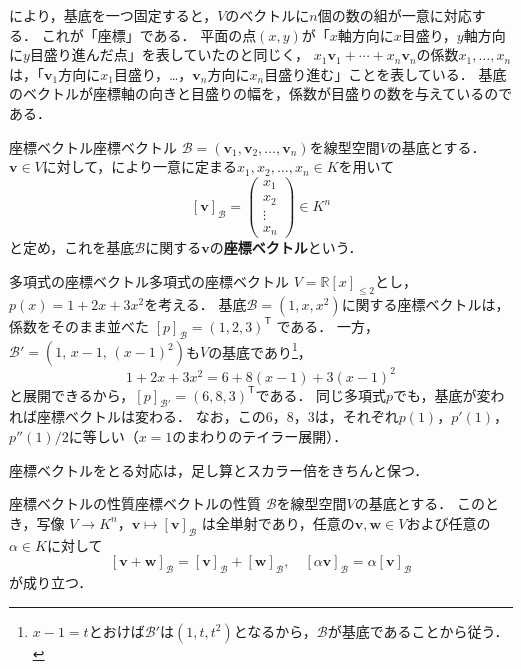 により，基底を一つ固定すると，$V$のベクトルに$n$個の数の組が一意に対応する．
これが「座標」である．
平面の点$(x,y)$が「$x$軸方向に$x$目盛り，$y$軸方向に$y$目盛り進んだ点」を表していたのと同じく，
$x_1\bm{v}_1+\cdots+x_n\bm{v}_n$の係数$x_1,\dots,x_n$は，「$\bm{v}_1$方向に$x_1$目盛り，…，$\bm{v}_n$方向に$x_n$目盛り進む」ことを表している．
基底のベクトルが座標軸の向きと目盛りの幅を，係数が目盛りの数を与えているのである．

\begin{definition}{座標ベクトル}{座標ベクトル}
  $\mathcal{B} = (\bm{v}_1, \bm{v}_2, \dots, \bm{v}_n)$を線型空間$V$の基底とする．
  $\bm{v} \in V$に対して，により一意に定まる$x_1, x_2, \dots, x_n \in K$を用いて
  \[
    [\bm{v}]_{\mathcal{B}}
    = \begin{pmatrix} x_1 \\ x_2 \\ \vdots \\ x_n \end{pmatrix} \in K^n
  \]
  と定め，これを基底$\mathcal{B}$に関する$\bm{v}$の\textbf{座標ベクトル}という．
\end{definition}

\begin{example}{多項式の座標ベクトル}{多項式の座標ベクトル}
  $V=\mathbb{R}[x]_{\le 2}$とし，$p(x)=1+2x+3x^2$を考える．
  基底$\mathcal{B}=(1,x,x^2)$に関する座標ベクトルは，係数をそのまま並べた
  $[p]_{\mathcal{B}}=(1,2,3)^\mathsf{T}$
  である．
  一方，$\mathcal{B}'=(1,\,x-1,\,(x-1)^2)$も$V$の基底であり\footnote{$x-1=t$とおけば$\mathcal{B}'$は$(1,t,t^2)$となるから，$\mathcal{B}$が基底であることから従う．}，
  \[
    1+2x+3x^2 = 6+8(x-1)+3(x-1)^2
  \]
  と展開できるから，$[p]_{\mathcal{B}'}=(6,8,3)^\mathsf{T}$である．
  同じ多項式$p$でも，基底が変われば座標ベクトルは変わる．
  なお，この$6$，$8$，$3$は，それぞれ$p(1)$，$p'(1)$，$p''(1)/2$に等しい（$x=1$のまわりのテイラー展開）．
\end{example}

座標ベクトルをとる対応は，足し算とスカラー倍をきちんと保つ．

\begin{prop}{座標ベクトルの性質}{座標ベクトルの性質}
  $\mathcal{B}$を線型空間$V$の基底とする．
  このとき，写像
  $V \to K^n$，$\bm{v} \mapsto [\bm{v}]_{\mathcal{B}}$
  は全単射であり，任意の$\bm{v}, \bm{w} \in V$および任意の$\alpha \in K$に対して
  \[
    [\bm{v} + \bm{w}]_{\mathcal{B}} = [\bm{v}]_{\mathcal{B}} + [\bm{w}]_{\mathcal{B}},
    \quad
    [\alpha \bm{v}]_{\mathcal{B}} = \alpha [\bm{v}]_{\mathcal{B}}
  \]
  が成り立つ．
\end{prop}

